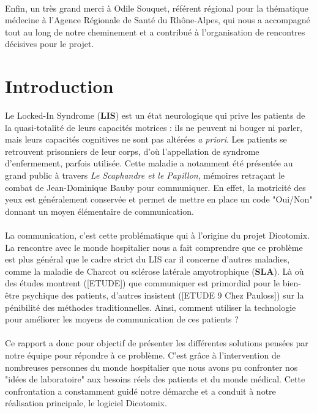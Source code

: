 \documentclass[11pt,a4paper]{article}
\theoremstyle{plain}
\theoremstyle{definition}
\begin{document}
\paragraph{}Enfin, un très grand merci à Odile Souquet, référent régional pour la thématique médecine à l'Agence Régionale de Santé du Rhône-Alpes, qui nous a accompagné tout 
au long de notre cheminement et a contribué à l'organisation de rencontres décisives pour le projet.

\newpage

\tableofcontents

\newpage
\section{Introduction}

Le Locked-In Syndrome (\textbf{LIS}) est un état neurologique qui prive les patients de la quasi-totalité de leurs capacités motrices : ils ne peuvent ni bouger ni parler,
mais leurs capacités cognitives ne sont pas altérées \textit{a priori}. Les patients se retrouvent prisonniers de leur corps, d'où l'appellation de syndrome d'enfermement, parfois utilisée.
Cette maladie a notamment été présentée au grand public à travers \textit{Le Scaphandre et le Papillon}, mémoires retraçant le combat de Jean-Dominique Bauby pour communiquer. 
En effet, la motricité des yeux est généralement conservée et permet de mettre en place un code "Oui/Non" donnant un moyen élémentaire de communication.

\paragraph{} La communication, c'est cette problématique qui à l'origine du projet Dicotomix. La rencontre avec le monde hospitalier nous a fait comprendre que ce problème est plus général 
que le cadre strict du LIS car il concerne d'autres maladies, comme la maladie de Charcot ou sclérose latérale amyotrophique (\textbf{SLA}). Là où des études montrent ([ETUDE]) que communiquer est primordial pour le bien-être psychique des patients, d'autres insistent ([ETUDE 9 Chez Pauloss]) sur la pénibilité des méthodes traditionnelles. Ainsi, comment utiliser la technologie pour améliorer les moyens de communication de ces patients ? 

\paragraph{} Ce rapport a donc pour objectif de présenter les différentes solutions pensées par notre équipe pour répondre à ce problème. C'est grâce à l'intervention de nombreuses personnes du monde hospitalier que 
nous avons pu confronter nos "idées de laboratoire" aux besoins réels des patients et du monde médical. Cette confrontation a constamment guidé notre démarche et a conduit à notre réalisation principale, le logiciel Dicotomix.
\end{document}
